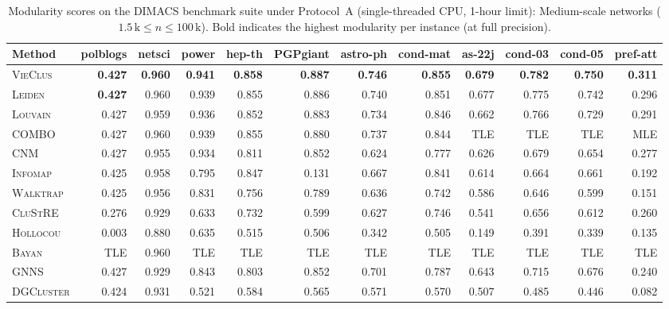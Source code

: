\documentclass[11pt,a4paper]{article}
\begin{document}
\begin{table}[H]
    \centering
    \caption{Modularity scores on the \textsc{DIMACS} benchmark suite under Protocol~A (single-threaded CPU, 1-hour limit): Medium-scale networks ($1.5\,\text{k} \le n \le 100\,\text{k}$). Bold indicates the highest modularity per instance (at full precision).}
    \label{tab:mod_dimacs_med}
    \vspace{0.5em}
    \small
    \setlength{\tabcolsep}{1.2pt}
    \begin{tabular*}{\textwidth}{@{\extracolsep{\fill}}l rrrrrrrrrrr@{}}
        \toprule
        Method & polblogs & netsci & power & hep-th & PGPgiant & astro-ph & cond-mat & as-22j & cond-03 & cond-05 & pref-att \\
        \midrule
        \textsc{VieClus} & \textbf{0.427} & \textbf{0.960} & \textbf{0.941} & \textbf{0.858} & \textbf{0.887} & \textbf{0.746} & \textbf{0.855} & \textbf{0.679} & \textbf{0.782} & \textbf{0.750} & \textbf{0.311} \\
        \textsc{Leiden} & \textbf{0.427} & 0.960 & 0.939 & 0.855 & 0.886 & 0.740 & 0.851 & 0.677 & 0.775 & 0.742 & 0.296 \\
        \textsc{Louvain} & 0.427 & 0.959 & 0.936 & 0.852 & 0.883 & 0.734 & 0.846 & 0.662 & 0.766 & 0.729 & 0.291 \\
        \textsc{COMBO} & 0.427 & 0.960 & 0.939 & 0.855 & 0.880 & 0.737 & 0.844 & TLE & TLE & TLE & MLE \\
        \textsc{CNM} & 0.427 & 0.955 & 0.934 & 0.811 & 0.852 & 0.624 & 0.777 & 0.626 & 0.679 & 0.654 & 0.277 \\
        \textsc{Infomap} & 0.425 & 0.958 & 0.795 & 0.847 & 0.131 & 0.667 & 0.841 & 0.614 & 0.664 & 0.661 & 0.192 \\
        \textsc{Walktrap} & 0.425 & 0.956 & 0.831 & 0.756 & 0.789 & 0.636 & 0.742 & 0.586 & 0.646 & 0.599 & 0.151 \\
        \textsc{CluStRE} & 0.276 & 0.929 & 0.633 & 0.732 & 0.599 & 0.627 & 0.746 & 0.541 & 0.656 & 0.612 & 0.260 \\
        \textsc{Hollocou} & 0.003 & 0.880 & 0.635 & 0.515 & 0.506 & 0.342 & 0.505 & 0.149 & 0.391 & 0.339 & 0.135 \\
        \textsc{Bayan} & TLE & 0.960 & TLE & TLE & TLE & TLE & TLE & TLE & TLE & TLE & TLE \\
        \midrule
        \textsc{GNNS} & 0.427 & 0.929 & 0.843 & 0.803 & 0.852 & 0.701 & 0.787 & 0.643 & 0.715 & 0.676 & 0.240 \\
        \textsc{DGCluster} & 0.424 & 0.931 & 0.521 & 0.584 & 0.565 & 0.571 & 0.570 & 0.507 & 0.485 & 0.446 & 0.082 \\

\end{tabular*}
\end{table}
\end{document}

